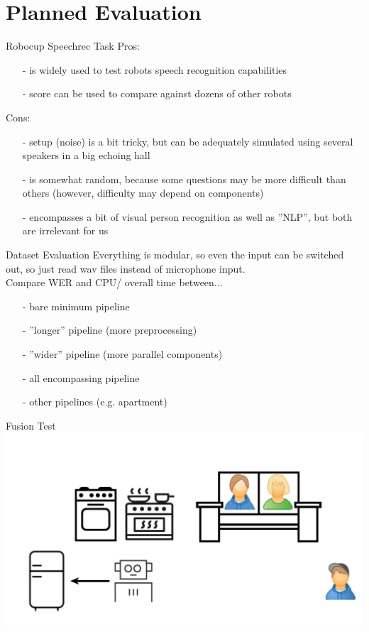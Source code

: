 \documentclass{beamer}
\begin{document}
	
	
	
	
	
	
	
	\section{Planned Evaluation}
	
	\begin{frame}{Robocup Speechrec Task}
		\pause
		Pros:
		\begin{itemize}
			\item[-] is widely used to test robots speech recognition capabilities
			\item[-] score can be used to compare against dozens of other robots
		\end{itemize}
		\pause
		Cons:
		\begin{itemize}
			\item[-] setup (noise) is a bit tricky, but can be adequately simulated using several speakers in a big echoing hall
			\item[-] is somewhat random, because some questions may be more difficult than others (however, difficulty may depend on components)
			\item[-] encompasses a bit of visual person recognition as well as ''NLP'', but both are irrelevant for us
		\end{itemize}
	\end{frame}
	
	\begin{frame}{Dataset Evaluation}
		Everything is modular, so even the input can be switched out, so just read wav files instead of microphone input.\\

		Compare WER and CPU/ overall time between...
		\begin{itemize}
			\item[-] bare minimum pipeline
			\item[-] ''longer'' pipeline (more preprocessing)
			\item[-] ''wider'' pipeline (more parallel components)
			\item[-] all encompassing pipeline
			\item[-] other pipelines (e.g. apartment)
		\end{itemize}
	\end{frame}
	
	\begin{frame}{Fusion Test}
		\centering
		\includegraphics[width=.75\textwidth]{Bilder/fusion_test_0}
	\end{frame}
	
\end{document}
